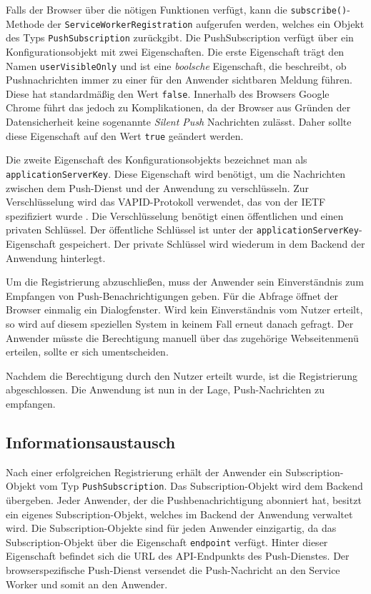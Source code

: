 Falls der Browser über die nötigen Funktionen verfügt, kann die \texttt{subscribe()}-Methode der \texttt{ServiceWorkerRegistration} aufgerufen werden,
welches ein Objekt des Typs \texttt{PushSubscription} zurückgibt. 
Die PushSubscription verfügt über ein Konfigurationsobjekt mit zwei Eigenschaften. Die erste Eigenschaft trägt den Namen \texttt{userVisibleOnly} und ist eine \textit{boolsche} Eigenschaft, die  beschreibt, ob Pushnachrichten immer zu einer für den Anwender sichtbaren Meldung führen. Diese hat standardmäßig den Wert \texttt{false}. Innerhalb des Browsers Google Chrome führt das jedoch zu Komplikationen, da der Browser aus Gründen der Datensicherheit keine sogenannte \textit{Silent Push} Nachrichten zulässt. Daher sollte diese Eigenschaft auf den Wert \texttt{true} geändert werden. 

Die zweite Eigenschaft des Konfigurationsobjekts bezeichnet man als\\ \texttt{applicationServerKey}. Diese Eigenschaft wird benötigt, um die Nachrichten zwischen dem Push-Dienst und der Anwendung zu verschlüsseln. Zur Verschlüsselung wird das \ac{VAPID}-Protokoll verwendet, das von der IETF spezifiziert wurde \cite{rfc8292}. Die Verschlüsselung benötigt einen öffentlichen und einen privaten Schlüssel. Der öffentliche Schlüssel ist unter der \texttt{applicationServerKey}-Eigenschaft gespeichert. Der private Schlüssel wird wiederum in dem Backend der Anwendung hinterlegt. 

Um die Registrierung abzuschließen, muss der Anwender sein Einverständnis zum Empfangen von Push-Benachrichtigungen geben. Für die Abfrage öffnet der Browser einmalig ein Dialogfenster. Wird kein Einverständnis vom Nutzer erteilt, so wird auf diesem speziellen System in keinem Fall erneut danach gefragt. Der Anwender müsste die Berechtigung manuell über das zugehörige Webseitenmenü erteilen, sollte er sich umentscheiden. 

Nachdem die Berechtigung durch den Nutzer erteilt wurde, ist die Registrierung abgeschlossen. Die Anwendung ist nun in der Lage, Push-Nachrichten zu empfangen. 

\subsection{Informationsaustausch}

Nach einer erfolgreichen Registrierung erhält der Anwender ein Subscription-Objekt vom Typ \texttt{PushSubscription}.
Das Subscription-Objekt wird dem Backend übergeben. Jeder Anwender, der die Pushbenachrichtigung abonniert hat, besitzt ein eigenes Subscription-Objekt, welches im Backend der Anwendung verwaltet wird. 
Die Subscription-Objekte sind für jeden Anwender einzigartig, da das Subscription-Objekt über die Eigenschaft \texttt{endpoint} verfügt. Hinter dieser Eigenschaft befindet sich die URL des API-Endpunkts des Push-Dienstes. Der browserspezifische Push-Dienst versendet die Push-Nachricht an den Service Worker und somit an den Anwender. 

